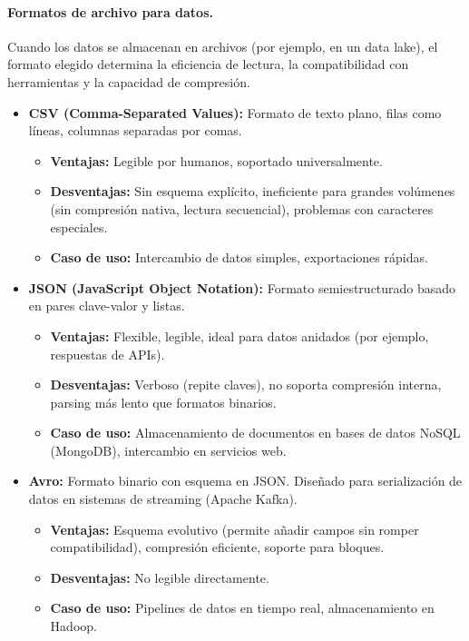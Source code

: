 \documentclass[12pt,a4paper,openany,oneside]{book}
\begin{document}
\paragraph{Formatos de archivo para datos.}
Cuando los datos se almacenan en archivos (por ejemplo, en un data lake), el formato elegido determina la eficiencia de lectura, la compatibilidad con herramientas y la capacidad de compresión.

\begin{itemize}
    \item \textbf{CSV (Comma-Separated Values):} Formato de texto plano, filas como líneas, columnas separadas por comas. 
        \begin{itemize}
            \item \textbf{Ventajas:} Legible por humanos, soportado universalmente.
            \item \textbf{Desventajas:} Sin esquema explícito, ineficiente para grandes volúmenes (sin compresión nativa, lectura secuencial), problemas con caracteres especiales.
            \item \textbf{Caso de uso:} Intercambio de datos simples, exportaciones rápidas.
        \end{itemize}
    \item \textbf{JSON (JavaScript Object Notation):} Formato semiestructurado basado en pares clave-valor y listas.
        \begin{itemize}
            \item \textbf{Ventajas:} Flexible, legible, ideal para datos anidados (por ejemplo, respuestas de APIs).
            \item \textbf{Desventajas:} Verboso (repite claves), no soporta compresión interna, parsing más lento que formatos binarios.
            \item \textbf{Caso de uso:} Almacenamiento de documentos en bases de datos NoSQL (MongoDB), intercambio en servicios web.
        \end{itemize}
    \item \textbf{Avro:} Formato binario con esquema en JSON. Diseñado para serialización de datos en sistemas de streaming (Apache Kafka).
        \begin{itemize}
            \item \textbf{Ventajas:} Esquema evolutivo (permite añadir campos sin romper compatibilidad), compresión eficiente, soporte para bloques.
            \item \textbf{Desventajas:} No legible directamente.
            \item \textbf{Caso de uso:} Pipelines de datos en tiempo real, almacenamiento en Hadoop.

\end{itemize}
\end{itemize}
\end{document}

